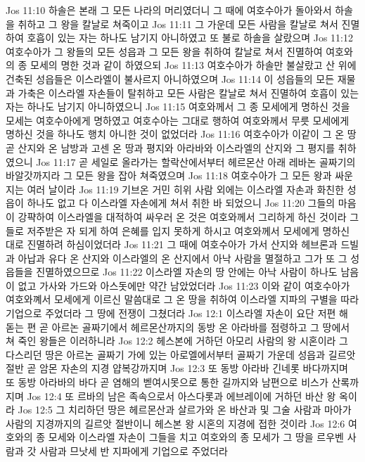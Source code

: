 Jos 11:10  하솔은 본래 그 모든 나라의 머리였더니 그 때에 여호수아가 돌아와서 하솔을 취하고 그 왕을 칼날로 쳐죽이고
Jos 11:11  그 가운데 모든 사람을 칼날로 쳐서 진멸하여 호흡이 있는 자는 하나도 남기지 아니하였고 또 불로 하솔을 살랐으며
Jos 11:12  여호수아가 그 왕들의 모든 성읍과 그 모든 왕을 취하여 칼날로 쳐서 진멸하여 여호와의 종 모세의 명한 것과 같이 하였으되
Jos 11:13  여호수아가 하솔만 불살랐고 산 위에 건축된 성읍들은 이스라엘이 불사르지 아니하였으며
Jos 11:14  이 성읍들의 모든 재물과 가축은 이스라엘 자손들이 탈취하고 모든 사람은 칼날로 쳐서 진멸하여 호흡이 있는 자는 하나도 남기지 아니하였으니
Jos 11:15  여호와께서 그 종 모세에게 명하신 것을 모세는 여호수아에게 명하였고 여호수아는 그대로 행하여 여호와께서 무릇 모세에게 명하신 것을 하나도 행치 아니한 것이 없었더라
Jos 11:16  여호수아가 이같이 그 온 땅 곧 산지와 온 남방과 고센 온 땅과 평지와 아라바와 이스라엘의 산지와 그 평지를 취하였으니
Jos 11:17  곧 세일로 올라가는 할락산에서부터 헤르몬산 아래 레바논 골짜기의 바알갓까지라 그 모든 왕을 잡아 쳐죽였으며
Jos 11:18  여호수아가 그 모든 왕과 싸운 지는 여러 날이라
Jos 11:19  기브온 거민 히위 사람 외에는 이스라엘 자손과 화친한 성읍이 하나도 없고 다 이스라엘 자손에게 쳐서 취한 바 되었으니
Jos 11:20  그들의 마음이 강퍅하여 이스라엘을 대적하여 싸우러 온 것은 여호와께서 그리하게 하신 것이라 그들로 저주받은 자 되게 하여 은혜를 입지 못하게 하시고 여호와께서 모세에게 명하신 대로 진멸하려 하심이었더라
Jos 11:21  그 때에 여호수아가 가서 산지와 헤브론과 드빌과 아납과 유다 온 산지와 이스라엘의 온 산지에서 아낙 사람을 멸절하고 그가 또 그 성읍들을 진멸하였으므로
Jos 11:22  이스라엘 자손의 땅 안에는 아낙 사람이 하나도 남음이 없고 가사와 가드와 아스돗에만 약간 남았었더라
Jos 11:23  이와 같이 여호수아가 여호와꼐서 모세에게 이르신 말씀대로 그 온 땅을 취하여 이스라엘 지파의 구별을 따라 기업으로 주었더라 그 땅에 전쟁이 그쳤더라
Jos 12:1  이스라엘 자손이 요단 저편 해 돋는 편 곧 아르논 골짜기에서 헤르몬산까지의 동방 온 아라바를 점령하고 그 땅에서 쳐 죽인 왕들은 이러하니라
Jos 12:2  헤스본에 거하던 아모리 사람의 왕 시혼이라 그 다스리던 땅은 아르논 골짜기 가에 있는 아로엘에서부터 골짜기 가운데 성읍과 길르앗 절반 곧 암몬 자손의 지경 얍복강까지며
Jos 12:3  또 동방 아라바 긴네롯 바다까지며 또 동방 아라바의 바다 곧 염해의 벧여시못으로 통한 길까지와 남편으로 비스가 산록까지며
Jos 12:4  또 르바의 남은 족속으로서 아스다롯과 에브레이에 거하던 바산 왕 옥이라
Jos 12:5  그 치리하던 땅은 헤르몬산과 살르가와 온 바산과 및 그술 사람과 마아가 사람의 지경까지의 길르앗 절반이니 헤스본 왕 시혼의 지경에 접한 것이라
Jos 12:6  여호와의 종 모세와 이스라엘 자손이 그들을 치고 여호와의 종 모세가 그 땅을 르우벤 사람과 갓 사람과 므낫세 반 지파에게 기업으로 주었더라
